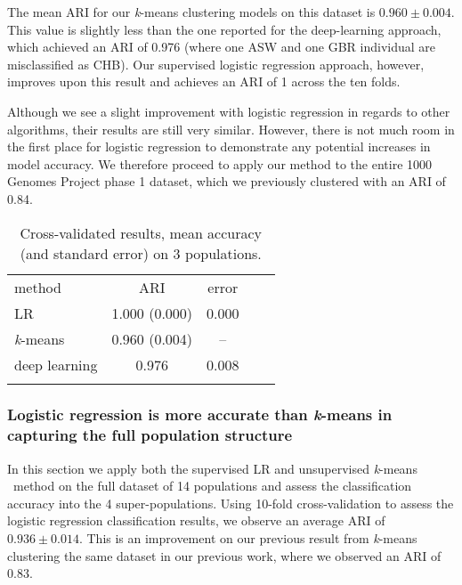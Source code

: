 \documentclass{llncs}
\newcommand{\kMeans}{\textit{k}-means }
\begin{document}
{The mean ARI for our \kMeans{} clustering models on this dataset is \(0.960 \pm 0.004 \). 
This value is slightly less than the one reported for the deep-learning approach, which achieved an ARI of 0.976 (where one ASW and one GBR individual are misclassified as CHB). 
Our supervised logistic regression approach, however, improves upon this result and achieves an ARI of 1 across the ten folds.

Although we see a slight improvement with logistic regression in regards to other algorithms, their results are still very similar.
However, there is not much room in the first place for logistic regression to demonstrate any potential increases in model accuracy.
We therefore proceed to apply our method to the entire 1000 Genomes Project phase 1 dataset, which we previously clustered with an ARI of 0.84.


\begin{table}
\caption{Cross-validated results, mean accuracy (and standard error) on 3 populations.}
\begin{center}
\renewcommand{\arraystretch}{1.4}
\setlength\tabcolsep{3pt}
\begin{tabular}{lcccc}
\hline\noalign{\smallskip}
method  & ARI & error \\
LR  & 1.000 (0.000) & 0.000 \\
\kMeans & 0.960 (0.004) & -- \\
deep learning & 0.976 & 0.008 \\
\noalign{\smallskip}
\hline
\end{tabular}
\end{center}
\end{table}


\subsubsection{Logistic regression is more accurate than \kMeans{} in capturing the full population structure}
In this section we apply both the supervised LR and unsupervised \kMeans\ method on the full dataset of 14 populations and assess the 
classification accuracy into the 4 super-populations.
Using 10-fold cross-validation to assess the logistic regression classification results, we observe an average ARI of \(0.936 \pm{} 0.014\).
This is an improvement on our previous result from \kMeans{} clustering the same dataset in our previous work, where we observed an ARI of \(0.83\).

}
\end{document}
